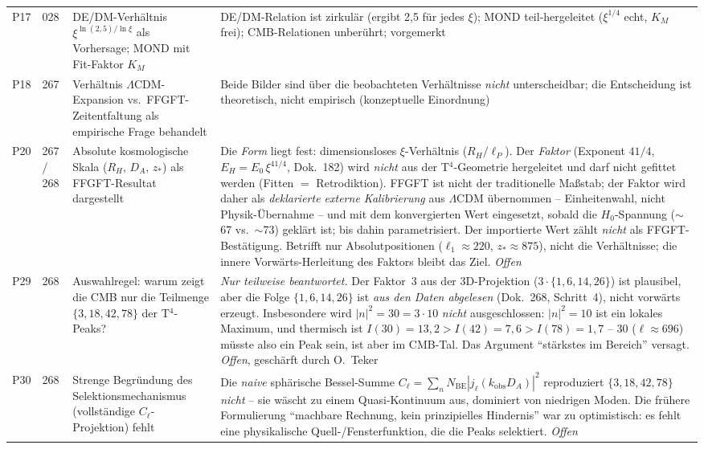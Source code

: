 {\begin{longtable}{p{0.6cm}p{2.4cm}p{5.5cm}p{5.5cm}}
P17 & 028 &
  DE/DM-Verhältnis $\xi^{\ln(2{,}5)/\ln\xi}$ als Vorhersage; MOND mit Fit-Faktor $K_M$ &
  DE/DM-Relation ist zirkulär (ergibt 2,5 für jedes $\xi$); MOND teil-hergeleitet ($\xi^{1/4}$ echt, $K_M$ frei); CMB-Relationen unberührt; vorgemerkt \\[3pt]
P18 & 267 &
  Verhältnis $\Lambda$CDM-Expansion vs.\ FFGFT-Zeitentfaltung als empirische Frage behandelt &
  Beide Bilder sind über die beobachteten Verhältnisse \emph{nicht} unterscheidbar; die Entscheidung ist theoretisch, nicht empirisch (konzeptuelle Einordnung) \\[3pt]
P20 & 267 / 268 &
  Absolute kosmologische Skala ($R_H$, $D_A$, $z_*$) als FFGFT-Resultat dargestellt &
  Die \emph{Form} liegt fest: dimensionsloses $\xi$-Verhältnis ($R_H/\ell_P$). Der \emph{Faktor} (Exponent $41/4$, $E_H = E_0\,\xi^{41/4}$, Dok.~182) wird \emph{nicht} aus der T$^4$-Geometrie hergeleitet und darf nicht gefittet werden (Fitten $=$ Retrodiktion). FFGFT ist nicht der traditionelle Maßstab; der Faktor wird daher als \emph{deklarierte externe Kalibrierung} aus $\Lambda$CDM übernommen -- Einheitenwahl, nicht Physik-Übernahme -- und mit dem konvergierten Wert eingesetzt, sobald die $H_0$-Spannung ($\sim$67 vs.\ $\sim$73) geklärt ist; bis dahin parametrisiert. Der importierte Wert zählt \emph{nicht} als FFGFT-Bestätigung. Betrifft nur Absolutpositionen ($\ell_1\approx220$, $z_*\approx875$), nicht die Verhältnisse; die innere Vorwärts-Herleitung des Faktors bleibt das Ziel. \emph{Offen} \\[3pt]
P29 & 268 &
  Auswahlregel: warum zeigt die CMB nur die Teilmenge $\{3,18,42,78\}$ der T$^4$-Peaks? &
  \emph{Nur teilweise beantwortet.} Der Faktor~3 aus der 3D-Projektion ($3\cdot\{1,6,14,26\}$) ist plausibel, aber die Folge $\{1,6,14,26\}$ ist \emph{aus den Daten abgelesen} (Dok.~268, Schritt~4), nicht vorwärts erzeugt. Insbesondere wird $|n|^2=30=3\cdot10$ \emph{nicht} ausgeschlossen: $|n|^2=10$ ist ein lokales Maximum, und thermisch ist $I(30)=13{,}2 > I(42)=7{,}6 > I(78)=1{,}7$ -- $30$ ($\ell\approx696$) müsste also ein Peak sein, ist aber im CMB-Tal. Das Argument ``stärkstes im Bereich'' versagt. \emph{Offen}, geschärft durch O.~Teker \\[3pt]
P30 & 268 &
  Strenge Begründung des Selektionsmechanismus (vollständige $C_\ell$-Projektion) fehlt &
  Die \emph{naive} sphärische Bessel-Summe $C_\ell=\sum_n N_\mathrm{BE}|j_\ell(k_\mathrm{obs}D_A)|^2$ reproduziert $\{3,18,42,78\}$ \emph{nicht} -- sie wäscht zu einem Quasi-Kontinuum aus, dominiert von niedrigen Moden. Die frühere Formulierung ``machbare Rechnung, kein prinzipielles Hindernis'' war zu optimistisch: es fehlt eine physikalische Quell-/Fensterfunktion, die die Peaks selektiert. \emph{Offen} \\[3pt]

\end{longtable}}
